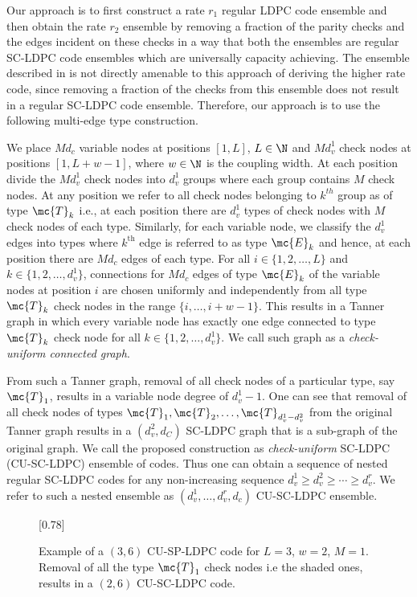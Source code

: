 \documentclass[conference]{IEEEtran}
\begin{document}
Our approach is to first construct a rate $r_{1}$ regular LDPC code ensemble and then obtain the rate $r_{2}$ ensemble by removing a fraction of the parity checks and the edges incident on these checks in a way that both the ensembles are regular SC-LDPC code ensembles which are universally capacity achieving. The ensemble described in \cite{KudekarUrbanke11} is not directly amenable to this approach of deriving the higher rate code, since removing a fraction of the checks from this ensemble does not result in a regular SC-LDPC code ensemble. Therefore, our approach is to use the following multi-edge type construction.

We place $Md_{c}$ variable nodes at positions $[1,L]$, $L\in\N$ and $Md_{v}^{1}$ check nodes at positions $[1,L+w-1]$, where $w\in \N$ is the coupling width. At each position divide the $Md_{v}^{1}$ check nodes into $d_{v}^{1}$ groups where each group contains $M$ check nodes. At any position we refer to all check nodes belonging to $k^{th}$ group as of type $\mc{T}_{k}$ i.e.,  at each position there are $d_{v}^{1}$ types of check nodes with $M$ check nodes of each type. Similarly, for each variable node, we classify the $d_{v}^{1}$ edges into types where $k^{\text{th}}$ edge is referred to as type $\mc{E}_{k}$ and hence, at each position there are $Md_{c}$ edges of each type. For all $i\in\{1,2,\ldots,L\}$ and $k\in\{1,2,\ldots ,d_{v}^{1}\}$, connections for $Md_{c}$ edges of type $\mc{E}_{k}$ of the variable nodes at position $i$ are chosen uniformly and independently from all type $\mc{T}_{k}$ check nodes in the range $\{i,\ldots , i+w-1\}$. This results in a Tanner graph in which every variable node has exactly one edge connected to type $\mc{T}_{k}$ check node for all $k\in \{1,2,\ldots , d_{v}^{1}\}$. We call such graph as a \textit{check-uniform connected graph}.

From such a Tanner graph, removal of all check nodes of a particular type, say $\mc{T}_{1}$, results in a variable node degree of $d_{v}^{1}-1$.  One can see that
removal of all check nodes of types $\mc{T}_{1},\mc{T}_{2},\ldots, \mc{T}_{d_{v}^{1}-d_{v}^{2}} $ from the original Tanner graph results in a $(d_{v}^{2},d_{C})$ SC-LDPC graph that is a sub-graph of the original graph.
We call the proposed construction as \textit{check-uniform} SC-LDPC (CU-SC-LDPC) ensemble of codes. Thus one can obtain a sequence of nested regular SC-LDPC codes for any non-increasing sequence $d_{v}^{1}\geq d_{v}^{2}\geq\cdots \geq d_{v}^{r}$. 
We refer to such a nested ensemble as $(d_{v}^{1},\ldots ,d_{v}^{r},d_{c})$ CU-SC-LDPC ensemble.
 \begin{figure}[h!]
\centering
\scalebox{1}[0.78]{}
\caption{Example of a $(3,6)$ CU-SP-LDPC code for $L=3$, $w=2$, $M=1$. Removal of all the type $\mc{T}_{1}$ check nodes i.e the shaded ones, results in a $(2,6)$ CU-SC-LDPC code.}
\label{Basegraph}
\end{figure}
\end{document}
